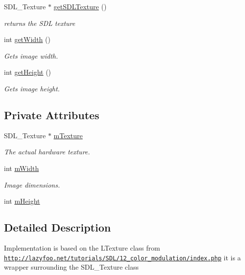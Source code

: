 \begin{DoxyCompactItemize}
S\+D\+L\+\_\+\+Texture $\ast$ \hyperlink{class_texture_a4c7638bab72e620b54cd8224019eb3dd}{get\+S\+D\+L\+Texture} ()
\begin{DoxyCompactList}\small\item\em returns the S\+DL texture \end{DoxyCompactList}\item 
int \hyperlink{class_texture_a91a6fd3355bc870194851514194daaab}{get\+Width} ()
\begin{DoxyCompactList}\small\item\em Gets image width. \end{DoxyCompactList}\item 
int \hyperlink{class_texture_a80e143905655b173df5994300088ce35}{get\+Height} ()
\begin{DoxyCompactList}\small\item\em Gets image height. \end{DoxyCompactList}\end{DoxyCompactItemize}
\subsection*{Private Attributes}
\begin{DoxyCompactItemize}
\item 
S\+D\+L\+\_\+\+Texture $\ast$ \hyperlink{class_texture_a28e61626f21dd1c69968e53687a13424}{m\+Texture}
\begin{DoxyCompactList}\small\item\em The actual hardware texture. \end{DoxyCompactList}\item 
int \hyperlink{class_texture_a0e007f4b4f1a314e5b0dae1402a13afb}{m\+Width}
\begin{DoxyCompactList}\small\item\em Image dimensions. \end{DoxyCompactList}\item 
int \hyperlink{class_texture_ad7078e03c0ef6e69b733eb85fd72aec2}{m\+Height}
\end{DoxyCompactItemize}


\subsection{Detailed Description}
Implementation is based on the L\+Texture class from \href{http://lazyfoo.net/tutorials/SDL/12_color_modulation/index.php}{\tt http\+://lazyfoo.\+net/tutorials/\+S\+D\+L/12\+\_\+color\+\_\+modulation/index.\+php} it is a wrapper surrounding the S\+D\+L\+\_\+\+Texture class 

